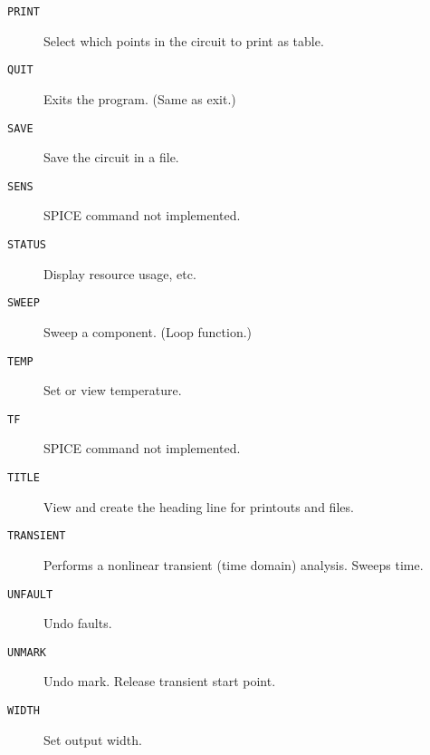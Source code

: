 \begin{description}
\item[{\tt PRINT}] Select which points in the circuit to print as table.

\item[{\tt QUIT}] Exits the program.  (Same as exit.)

\item[{\tt SAVE}] Save the circuit in a file.

\item[{\tt SENS}] SPICE command not implemented.

\item[{\tt STATUS}] Display resource usage, etc.

\item[{\tt SWEEP}] Sweep a component.  (Loop function.)

\item[{\tt TEMP}] Set or view temperature.

\item[{\tt TF}] SPICE command not implemented.

\item[{\tt TITLE}] View and create the heading line for printouts and files.

\item[{\tt TRANSIENT}] Performs a nonlinear transient (time domain)
analysis.  Sweeps time.

\item[{\tt UNFAULT}] Undo faults.

\item[{\tt UNMARK}] Undo mark.  Release transient start point.

\item[{\tt WIDTH}] Set output width.

\end{description}
